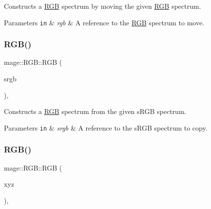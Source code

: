 Constructs a \hyperlink{structmage_1_1_r_g_b}{R\+GB} spectrum by moving the given \hyperlink{structmage_1_1_r_g_b}{R\+GB} spectrum.


\begin{DoxyParams}[1]{Parameters}
\mbox{\tt in}  & {\em rgb} & A reference to the \hyperlink{structmage_1_1_r_g_b}{R\+GB} spectrum to move. \\
\hline
\end{DoxyParams}
\hypertarget{structmage_1_1_r_g_b_a2f2c4eea3b0c44e0f31cfe20c6371d64}{}\label{structmage_1_1_r_g_b_a2f2c4eea3b0c44e0f31cfe20c6371d64} 
\subsubsection{\texorpdfstring{R\+G\+B()}{RGB()}\hspace{0.1cm}{\footnotesize\ttfamily [5/8]}}
{\footnotesize\ttfamily mage\+::\+R\+G\+B\+::\+R\+GB (\begin{DoxyParamCaption}\item[{const \hyperlink{structmage_1_1_s_r_g_b}{S\+R\+GB} \&}]{srgb }\end{DoxyParamCaption})\hspace{0.3cm}{\ttfamily [explicit]}, {\ttfamily [noexcept]}}

Constructs a \hyperlink{structmage_1_1_r_g_b}{R\+GB} spectrum from the given s\+R\+GB spectrum.


\begin{DoxyParams}[1]{Parameters}
\mbox{\tt in}  & {\em srgb} & A reference to the s\+R\+GB spectrum to copy. \\
\hline
\end{DoxyParams}
\hypertarget{structmage_1_1_r_g_b_a62a2200960f84f1b6bd4b743510201a4}{}\label{structmage_1_1_r_g_b_a62a2200960f84f1b6bd4b743510201a4} 
\subsubsection{\texorpdfstring{R\+G\+B()}{RGB()}\hspace{0.1cm}{\footnotesize\ttfamily [6/8]}}
{\footnotesize\ttfamily mage\+::\+R\+G\+B\+::\+R\+GB (\begin{DoxyParamCaption}\item[{const \hyperlink{structmage_1_1_x_y_z}{X\+YZ} \&}]{xyz }\end{DoxyParamCaption})\hspace{0.3cm}{\ttfamily [explicit]}, {\ttfamily [noexcept]}}

